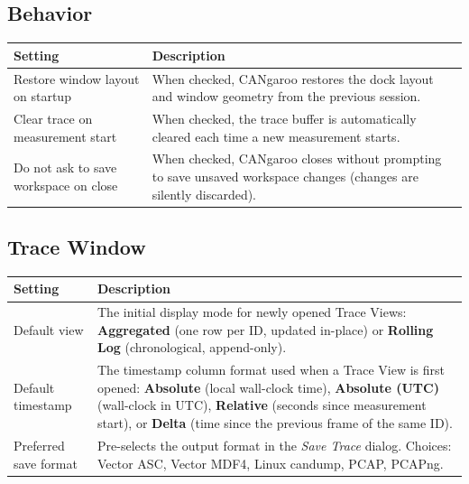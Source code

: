 \documentclass[a4paper,11pt]{article}
\newcommand{\menu}[1]{\textit{#1}}
\newcommand{\ui}[1]{\textbf{#1}}
\begin{document}
\subsection*{Behavior}

\begin{table}[h]
  \centering
  \begin{tabularx}{\textwidth}{lX}
    \toprule
    \textbf{Setting} & \textbf{Description} \\
    \midrule
    Restore window layout on startup
      & When checked, CANgaroo restores the dock layout and window
        geometry from the previous session. \\
    Clear trace on measurement start
      & When checked, the trace buffer is automatically cleared each time
        a new measurement starts. \\
    Do not ask to save workspace on close
      & When checked, CANgaroo closes without prompting to save unsaved
        workspace changes (changes are silently discarded). \\
    \bottomrule
  \end{tabularx}
\end{table}

\subsection*{Trace Window}

\begin{table}[h]
  \centering
  \begin{tabularx}{\textwidth}{lX}
    \toprule
    \textbf{Setting} & \textbf{Description} \\
    \midrule
    Default view
      & The initial display mode for newly opened Trace Views:
        \ui{Aggregated} (one row per ID, updated in-place) or
        \ui{Rolling Log} (chronological, append-only). \\
    Default timestamp
      & The timestamp column format used when a Trace View is first opened:
        \ui{Absolute} (local wall-clock time),
        \ui{Absolute (UTC)} (wall-clock in UTC),
        \ui{Relative} (seconds since measurement start), or
        \ui{Delta} (time since the previous frame of the same ID). \\
    Preferred save format
      & Pre-selects the output format in the \menu{Save Trace} dialog.
        Choices: Vector ASC, Vector MDF4, Linux candump, PCAP, PCAPng. \\
    \bottomrule
  \end{tabularx}
\end{table}
\end{document}
